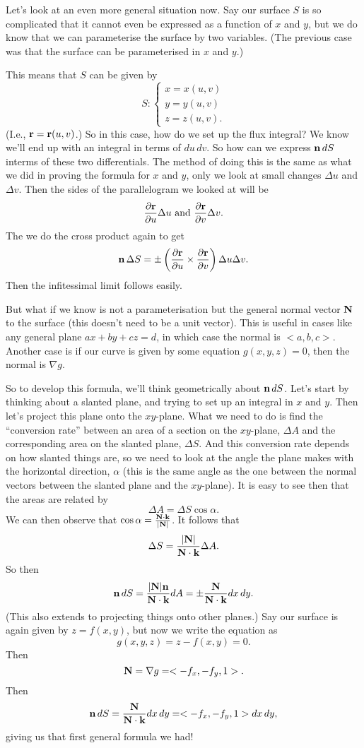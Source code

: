 Let's look at an even more general situation now. Say our surface $S$ is so complicated that it cannot even be expressed as a function of $x$ and $y$, but we do know that we can parameterise the surface by two variables. (The previous case was that the surface can be parameterised in $x$ and $y$.) 

This means that $S$ can be given by
\[ S: \begin{cases} x = x(u,v) \\ y = y(u,v) \\ z = z(u,v). \end{cases} \]
(I.e., $\boldsymbol{\mathbf{r}} = \boldsymbol{\mathbf{r}}(u,v)$.) So in this case, how do we set up the flux integral? We know we'll end up with an integral in terms of $du\,dv$. So how can we express $\boldsymbol{\mathbf{n}}\,dS$ interms of these two differentials. The method of doing this is the same as what we did in proving the formula for $x$ and $y$, only we look at small changes $\Delta u$ and $\Delta v$. Then the sides of the parallelogram we looked at will be 
\[ \pd{\vct{r}}{u}\Delta u\ \rmand\ \pd{\vct{r}}{v}\Delta v. \]
The we do the cross product again to get
\[ \boldsymbol{\mathbf{n}} \, \Delta S = \pm\left(\frac{\partial\boldsymbol{\mathbf{r}}}{\partial u} \times \frac{\partial\boldsymbol{\mathbf{r}}}{\partial v}\right)\Delta u \Delta v. \]
Then the infitessimal limit follows easily. 

But what if we know is not a parameterisation but the general normal vector $\boldsymbol{\mathbf{N}}$ to the surface (this doesn't need to be a unit vector). This is useful in cases like any general plane $ax+by+cz=d$, in which case the normal is $<a,b,c>$. Another case is if our curve is given by some equation $g(x,y,z)=0$, then the normal is $\nabla g$. 

So to develop this formula, we'll think geometrically about $\boldsymbol{\mathbf{n}} \, dS$. Let's start by thinking about a slanted plane, and trying to set up an integral in $x$ and $y$. Then let's project this plane onto the $xy$-plane. What we need to do is find the ``conversion rate'' between an area of a section on the $xy$-plane, $\Delta A$ and the corresponding area on the slanted plane, $\Delta S$. And this conversion rate depends on how slanted things are, so we need to look at the angle the plane makes with the horizontal direction, $\alpha$ (this is the same angle as the one between the normal vectors between the slanted plane and the $xy$-plane). It is easy to see then that the areas are related by
\[ \Delta A = \Delta S \cos \alpha. \]
We can then observe that $\cos \alpha = \frac{\boldsymbol{\mathbf{N}} \cdot \boldsymbol{\mathbf{k}}}{|\boldsymbol{\mathbf{N}}|}$. It follows that
\[ \Delta S = \frac{|\boldsymbol{\mathbf{N}}|}{\boldsymbol{\mathbf{N}} \cdot \boldsymbol{\mathbf{k}}} \Delta A. \]
So then
\[ \boldsymbol{\mathbf{n}} \, dS = \frac{|\boldsymbol{\mathbf{N}}|\boldsymbol{\mathbf{n}}}{\boldsymbol{\mathbf{N}} \cdot \boldsymbol{\mathbf{k}}} dA = \pm\frac{\boldsymbol{\mathbf{N}}}{\boldsymbol{\mathbf{N}} \cdot \boldsymbol{\mathbf{k}}} dx\,dy. \]
(This also extends to projecting things onto other planes.)
\bex
Say our surface is again given by $z=f(x,y)$, but now we write the equation as 
\[ g(x,y,z) = z-f(x,y) = 0. \]
Then 
\[ \boldsymbol{\mathbf{N}} = \nabla g = <-f_x,-f_y,1>. \]
Then
\[ \boldsymbol{\mathbf{n}} \, dS = \frac{\boldsymbol{\mathbf{N}}}{\boldsymbol{\mathbf{N}} \cdot \boldsymbol{\mathbf{k}}} dx\,dy = <-f_x,-f_y,1> dx\,dy, \]
giving us that first general formula we had!
\eex
